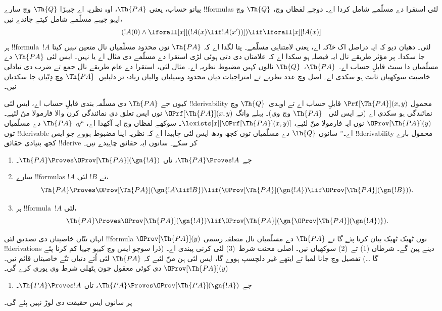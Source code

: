 \documentclass[../../../include/open-logic-section]{subfiles}
\begin{document}


پیانو حساب، یعنی $\Th{PA}$، اوہ نظریہ اے جیہڑا
$\Th{Q}$ وچ سارے !!{formula}s لئی استقرا دے مسلّمے
شامل کردا اے۔ دوجے لفظاں وچ، $\Th{Q}$ وچ ایہو جیہے
مسلّمے شامل کیتے جاندے نیں،
\[
(!A(0) \land \lforall[x][(!A(x) \lif !A(x'))]) \lif \lforall[x][!A(x)]
\]
ہر !!{formula}~$!A$ لئی۔ دھیان دیو کہ ایہ دراصل اک
\emph{خاکہ} اے، یعنی لامتناہی مسلّمے۔ پتا لگدا اے کہ
$\Th{PA}$ نوں محدود مسلّمیاں نال متعین {\em نہیں} کیتا
جا سکدا۔ پر مؤثر طریقے نال ایہ فیصلہ ہو سکدا اے کہ علامتاں
دی دتی ہوئی لڑی استقرا دے مسلّمے دی مثال اے یا نہیں۔
ایس لئی $\Th{PA}$ دے مسلّمیاں دا سیٹ قابلِ حساب اے۔
$\Th{PA}$،~$\Th{Q}$ نالوں کہیں مضبوط نظریہ اے۔ مثال لئی،
استقرا دے عام طریقے نال جمع تے ضرب دی تبادلی خاصیت
سوکھیاں ثابت ہو سکدی اے۔ اصل وچ عدد نظریے تے امتزاجیات
دیاں محدود وسیلیاں والیاں زیادہ تر دلیلیں~$\Th{PA}$ وچ
دِتّیاں جا سکدیاں نیں۔

کیوں جے $\Th{PA}$ دی مسلّمہ بندی قابلِ حساب اے، ایس لئی
!!{derivability} محمول $\Prf[\Th{PA}](x,y)$ قابلِ حساب اے
تے اوہدی~$\Th{Q}$ وچ نمائندگی ہو سکدی اے (تے ایس لئی
~$\Th{PA}$ وچ وی)۔ پہلے وانگ $\OPrf[\Th{PA}](x,y)$ نوں
ایس تعلق دی نمائندگی کرن والا فارمولا منّ لئیے۔
$\OProv[\Th{PA}](y)$ نوں ایہ فارمولا منّ لئیے،
$\lexists[x][\OPrf[\Th{PA}](x,y)]$۔ سوکھے لفظاں وچ ایہ
آکھدا اے، “$y$، $\Th{PA}$ دے مسلّمیاں توں !!{derivable}
اے۔” سانوں $\Th{Q}$ دے مسلّمیاں توں کجھ ودھ ایس لئی
چاہیدا اے کہ نظریہ اینا مضبوط ہووے جو ایس !!{derivability}
محمول بارے کجھ بنیادی حقائق !!{derive} کر سکے۔ سانوں
ایہ حقائق چاہیدے نیں۔
\begin{enumerate}
\item[P1.] جے $\Th{PA} \Proves !A$، تاں $\Th{PA} \Proves
  \OProv[\Th{PA}](\gn{!A})$۔
\item[P2.] سارے !!{formula}s $!A$ تے $!B$ لئی،
  \[
  \Th{PA} \Proves \OProv[\Th{PA}](\gn{!A \lif !B}) \lif
  (\OProv[\Th{PA}](\gn{!A}) \lif \OProv[\Th{PA}](\gn{!B})).
  \]
\item[P3.] ہر !!{formula}~$!A$ لئی،
  \[
  \Th{PA} \Proves \OProv[\Th{PA}](\gn{!A})
  \lif \OProv[\Th{PA}](\gn{\OProv[\Th{PA}](\gn{!A})}).
  \]
\end{enumerate}
انہاں تنّاں خاصیتاں دی تصدیق لئی !!{formula}
$\OProv[\Th{PA}](y)$ نوں ٹھیک ٹھیک بیان کرنا پئے گا تے
$\Th{PA}$ دے مسلّمیاں نال متعلقہ رسمی !!{derivation}s
دینے پین گے۔ شرطاں (1) تے~(2) سوکھیاں نیں۔ اصلی محنت
شرط~(3) لئی کرنی پیندی اے۔ (ذرا سوچو ایس وچ کیہو جیہا
کم کرنا پئے گا \dots) تفصیل وچ جانا لمبا تے ایتھے
غیر دلچسپ ہووے گا، ایس لئی ہن منّ لئیے کہ
$\Th{PA}$ لئی اُتے دتیاں تنّے خاصیتاں قائم نیں۔
$\OProv[\Th{PA}](y)$ دی کوئی معقول چون ہِٹھلی شرط وی
پوری کرے گی۔
\begin{enumerate}
\item[P4.] جے $\Th{PA} \Proves \OProv[\Th{PA}](\gn{!A})$،
  تاں $\Th{PA} \Proves !A$۔
\end{enumerate}
پر سانوں ایس حقیقت دی لوڑ نہیں پئے گی۔
\end{document}
